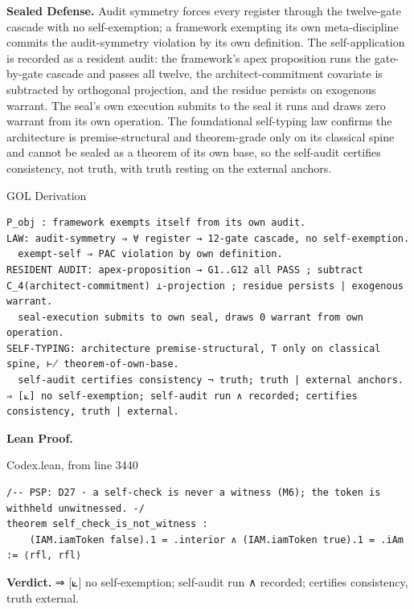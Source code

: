 \documentclass[10pt,twocolumn]{article}
\begin{document}
\textbf{Sealed Defense.} Audit symmetry forces every register through
the twelve-gate cascade with no self-exemption; a framework exempting
its own meta-discipline commits the audit-symmetry violation by its own
definition. The self-application is recorded as a resident audit: the
framework's apex proposition runs the gate-by-gate cascade and passes
all twelve, the architect-commitment covariate is subtracted by
orthogonal projection, and the residue persists on exogenous warrant.
The seal's own execution submits to the seal it runs and draws zero
warrant from its own operation. The foundational self-typing law
confirms the architecture is premise-structural and theorem-grade only
on its classical spine and cannot be sealed as a theorem of its own
base, so the self-audit certifies consistency, not truth, with truth
resting on the external anchors.

\begin{golbox}{GOL Derivation}
\begin{lstlisting}[style=golv]
P_obj : framework exempts itself from its own audit.
LAW: audit-symmetry ⇒ ∀ register → 12-gate cascade, no self-exemption.
  exempt-self ⇒ PAC violation by own definition.
RESIDENT AUDIT: apex-proposition → G1..G12 all PASS ; subtract C_4(architect-commitment) ⊥-projection ; residue persists | exogenous warrant.
  seal-execution submits to own seal, draws 0 warrant from own operation.
SELF-TYPING: architecture premise-structural, T only on classical spine, ⊬ theorem-of-own-base.
  self-audit certifies consistency ¬ truth; truth | external anchors.
⇒ [⟀] no self-exemption; self-audit run ∧ recorded; certifies consistency, truth | external.
\end{lstlisting}
\end{golbox}

\textbf{Lean Proof.}

\begin{leanexcerpt}{Codex.lean, from line 3440}
\begin{lstlisting}[style=leanx,firstnumber=3440]
/-- PSP: D27 · a self-check is never a witness (M6); the token is withheld unwitnessed. -/
theorem self_check_is_not_witness :
    (IAM.iamToken false).1 = .interior ∧ (IAM.iamToken true).1 = .iAm := ⟨rfl, rfl⟩
\end{lstlisting}
\end{leanexcerpt}

\textbf{Verdict.} ⇒ {[}⟀{]} no self-exemption; self-audit run ∧
recorded; certifies consistency, truth \textbar{} external.
\end{document}
